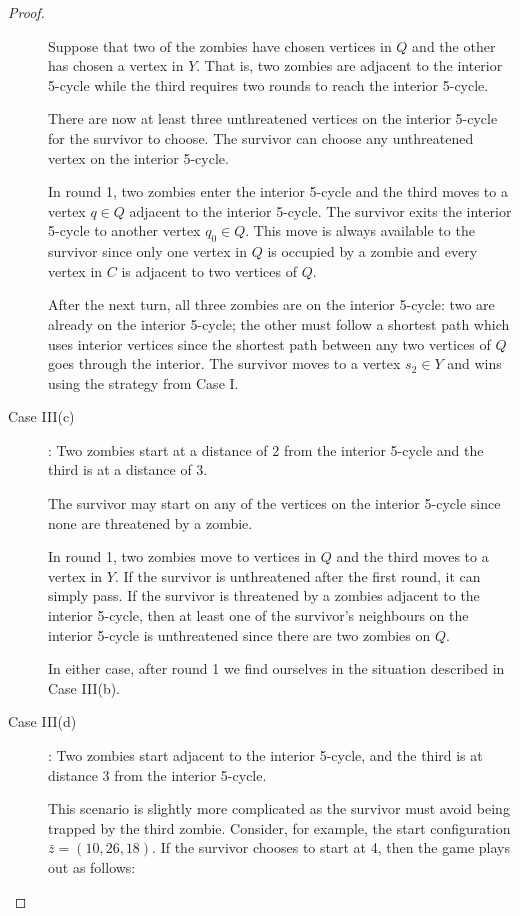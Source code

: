 \begin{proof}
\begin{description}
Suppose that two of the zombies have chosen vertices in $Q$ and the other has chosen a vertex in $Y$. That is, two zombies are adjacent to the interior 5-cycle
while the third requires two rounds to reach the interior 5-cycle.

There are now at least three unthreatened vertices on the interior 5-cycle for the survivor to choose. The survivor can choose any unthreatened vertex on
the interior 5-cycle.

In round 1, two zombies enter the interior 5-cycle and the third moves to a vertex $q \in Q$ adjacent to the interior 5-cycle.
The survivor exits the interior 5-cycle to another vertex $q_0 \in Q$. This move is always available to the survivor since only one vertex in $Q$ is occupied by
a zombie and every vertex in $C$ is adjacent to two vertices of $Q$.

After the next turn, all three zombies are on the interior 5-cycle: two are already on the interior 5-cycle; the other must follow a shortest path which uses interior vertices since the shortest path between any two vertices of $Q$ goes through the interior. The survivor moves to a vertex $s_2 \in Y$ and wins using the strategy from Case I.

\item[Case III(c)]: Two zombies start at a distance of 2 from the interior 5-cycle and the third is at a distance of 3.

The survivor may start on any of the vertices on the interior 5-cycle since none are threatened by a zombie.

In round 1, two zombies move to vertices in $Q$ and the third moves to a vertex in $Y$. If the survivor is unthreatened after the first round, it can simply pass.
If the survivor is threatened by a zombies adjacent to the interior 5-cycle, then at least one of the survivor's neighbours on the interior 5-cycle is unthreatened since there are two zombies on $Q$.

In either case, after round 1 we find ourselves in the situation described in Case III(b).

\item[Case III(d)]: Two zombies start adjacent to the interior 5-cycle, and the third is at distance 3 from the interior 5-cycle.

This scenario is slightly more complicated as the survivor must avoid being trapped by the third zombie. Consider, for example, the start configuration
$\bar{z} = (10, 26, 18)$. If the survivor chooses to start at 4, then the game plays out as follows:


\end{description}
\end{proof}
